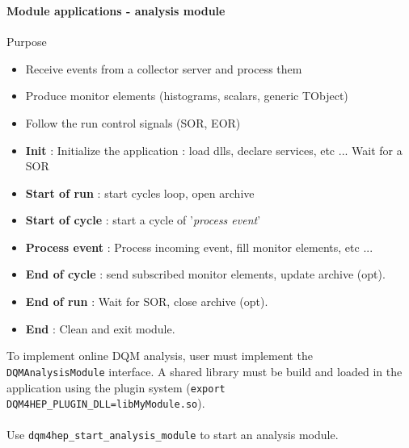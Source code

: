 \documentclass[8pt]{beamer}
\begin{document}
  
  \begin{frame}[containsverbatim]
    \frametitle{\secname}
    \framesubtitle{Module applications - analysis module}
    
    \begin{minipage}{0.78\textwidth}
      \begin{block}{Purpose}
        \begin{itemize}
          \item Receive events from a collector server and process them
          \item Produce monitor elements (histograms, scalars, generic TObject)
          \item Follow the run control signals (SOR, EOR)
        \end{itemize}
      \end{block}
              
      \begin{itemize}
        \item \textbf{Init} : Initialize the application : load dlls, declare services, etc ... Wait for a SOR
        \item \textbf{Start of run} : start cycles loop, open archive
        \item \textbf{Start of cycle} : start a cycle of '\textit{process event}'
        \item \textbf{Process event} : Process incoming event, fill monitor elements, etc ...
        \item \textbf{End of cycle} : send subscribed monitor elements, update archive (opt). 
        \item \textbf{End of run} : Wait for SOR, close archive (opt).
        \item \textbf{End} : Clean and exit module.
      \end{itemize}
      To implement online DQM analysis, user must implement the \verb|DQMAnalysisModule| interface. A shared library must be build and loaded in the application using the plugin system (\verb|export DQM4HEP_PLUGIN_DLL=libMyModule.so|). \\
      ~ \\
      Use \verb|dqm4hep_start_analysis_module| to start an analysis module.
        

\end{minipage}
\end{frame}
\end{document}
